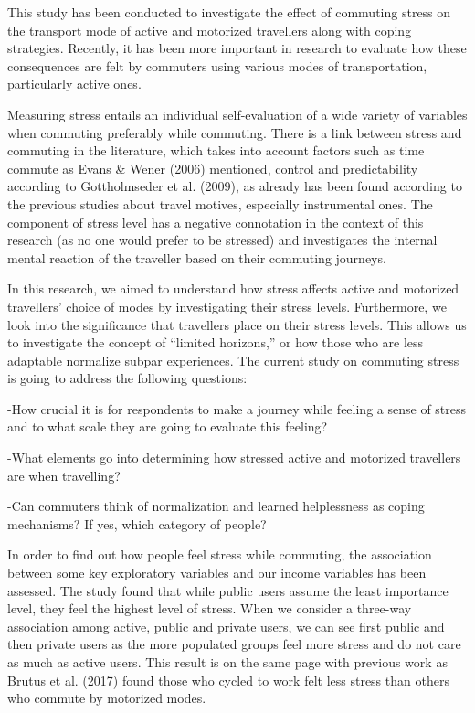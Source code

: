 \documentclass[
11pt, %
oneside, %
english, %
singlespacing, %
]{macthesis} %
\begin{document}
This study has been conducted to investigate the effect of commuting stress on the transport mode of active and motorized travellers along with coping strategies. Recently, it has been more important in research to evaluate how these consequences are felt by commuters using various modes of transportation, particularly active ones.

Measuring stress entails an individual self-evaluation of a wide variety of variables when commuting preferably while commuting. There is a link between stress and commuting in the literature, which takes into account factors such as time commute as Evans \& Wener (2006) mentioned, control and predictability according to Gottholmseder et al. (2009), as already has been found according to the previous studies about travel motives, especially instrumental ones. The component of stress level has a negative connotation in the context of this research (as no one would prefer to be stressed) and investigates the internal mental reaction of the traveller based on their commuting journeys.

In this research, we aimed to understand how stress affects active and motorized travellers' choice of modes by investigating their stress levels. Furthermore, we look into the significance that travellers place on their stress levels. This allows us to investigate the concept of ``limited horizons,'' or how those who are less adaptable normalize subpar experiences. The current study on commuting stress is going to address the following questions:

-How crucial it is for respondents to make a journey while feeling a sense of stress and to what scale they are going to evaluate this feeling?

-What elements go into determining how stressed active and motorized travellers are when travelling?

-Can commuters think of normalization and learned helplessness as coping mechanisms? If yes, which category of people?

In order to find out how people feel stress while commuting, the association between some key exploratory variables and our income variables has been assessed. The study found that while public users assume the least importance level, they feel the highest level of stress. When we consider a three-way association among active, public and private users, we can see first public and then private users as the more populated groups feel more stress and do not care as much as active users. This result is on the same page with previous work as Brutus et al. (2017) found those who cycled to work felt less stress than others who commute by motorized modes.
\end{document}
